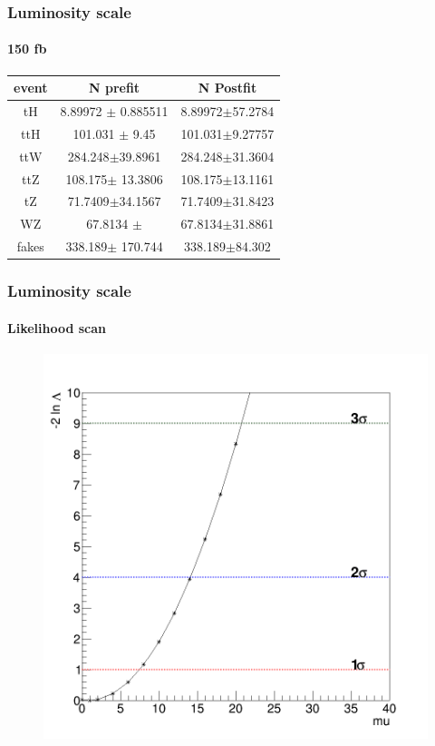 \documentclass[11pt]{beamer}
\begin{document}
\begin{frame}
\frametitle{Luminosity scale}
\framesubtitle{150 fb}
\begin{table}
	\begin{tabular}{|c|c|c|}
		\hline
event  & N prefit    & N Postfit \\
\hline
tH & 8.89972 $\pm$  0.885511 & 8.89972$\pm$57.2784\\
\hline
ttH  & 101.031 $\pm$  9.45& 101.031$\pm$9.27757\\
\hline
ttW  & 284.248$\pm$39.8961  & 284.248$\pm$31.3604\\
\hline
ttZ  & 108.175$\pm$  13.3806 & 108.175$\pm$13.1161\\
\hline
tZ & 71.7409$\pm$34.1567  & 71.7409$\pm$31.8423\\
\hline
WZ & 67.8134 $\pm$ & 67.8134$\pm$31.8861\\
\hline
fakes  & 338.189$\pm$  170.744  & 338.189$\pm$84.302\\
\hline
	\end{tabular}
\end{table}
\end{frame}


\begin{frame}
\frametitle{Luminosity scale}
\framesubtitle{Likelihood scan}
\begin{center}
	\begin{figure}
	\includegraphics[scale=0.25]{figures/150fb/Likelihood.png}
\end{figure}
\end{center}
\end{frame}
\end{document}
